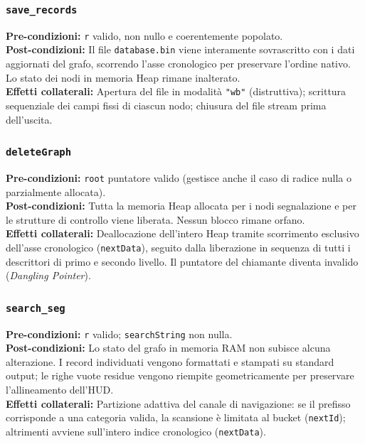 \documentclass[12pt, a4paper]{article}
\begin{document}
\subsubsection{\texttt{save\_records}}
\vspace{3mm}
\begin{specbox}
\textbf{Pre-condizioni:} \texttt{r} valido, non nullo e coerentemente popolato. \\
\textbf{Post-condizioni:} Il file \texttt{database.bin} viene interamente sovrascritto con i dati aggiornati del grafo, scorrendo l'asse cronologico per preservare l'ordine nativo. Lo stato dei nodi in memoria Heap rimane inalterato. \\
\textbf{Effetti collaterali:} Apertura del file in modalità \texttt{"wb"} (distruttiva); scrittura sequenziale dei campi fissi di ciascun nodo; chiusura del file stream prima dell'uscita.
\end{specbox}

\subsubsection{\texttt{deleteGraph}}
\vspace{3mm}
\begin{specbox}
\textbf{Pre-condizioni:} \texttt{root} puntatore valido (gestisce anche il caso di radice nulla o parzialmente allocata). \\
\textbf{Post-condizioni:} Tutta la memoria Heap allocata per i nodi segnalazione e per le strutture di controllo viene liberata. Nessun blocco rimane orfano. \\
\textbf{Effetti collaterali:} Deallocazione dell'intero Heap tramite scorrimento esclusivo dell'asse cronologico (\texttt{nextData}), seguito dalla liberazione in sequenza di tutti i descrittori di primo e secondo livello. Il puntatore del chiamante diventa invalido (\textit{Dangling Pointer}).
\end{specbox}

\subsubsection{\texttt{search\_seg}}
\vspace{3mm}
\begin{specbox}
\textbf{Pre-condizioni:} \texttt{r} valido; \texttt{searchString} non nulla. \\
\textbf{Post-condizioni:} Lo stato del grafo in memoria RAM non subisce alcuna alterazione. I record individuati vengono formattati e stampati su standard output; le righe vuote residue vengono riempite geometricamente per preservare l'allineamento dell'HUD. \\
\textbf{Effetti collaterali:} Partizione adattiva del canale di navigazione: se il prefisso corrisponde a una categoria valida, la scansione è limitata al bucket (\texttt{nextId}); altrimenti avviene sull'intero indice cronologico (\texttt{nextData}).
\end{specbox}
\end{document}

